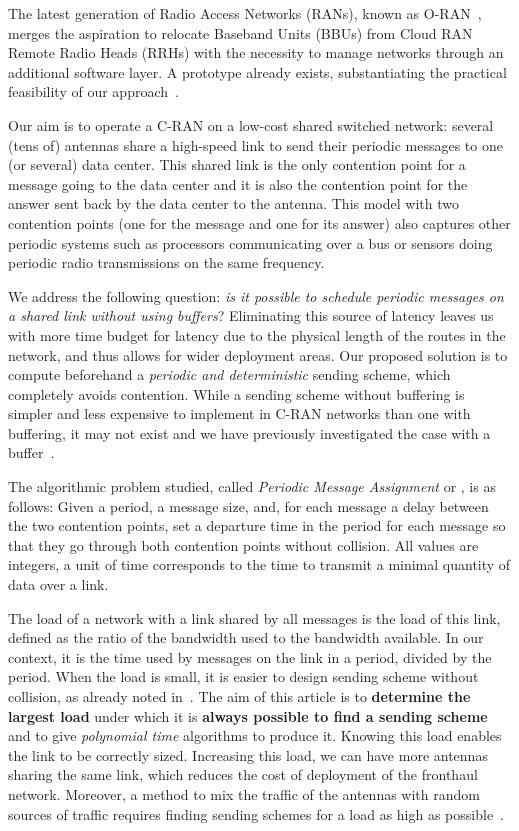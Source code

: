 \documentclass[pdflatex,sn-mathphys,iicol]{sn-jnl}%
\theoremstyle{thmstyleone}%
\theoremstyle{thmstyletwo}%
\theoremstyle{thmstylethree}%
\begin{document}
The latest generation of Radio Access Networks (RANs), known as O-RAN~\cite{polese2023understanding}, merges the aspiration to relocate Baseband Units (BBUs) from Cloud RAN Remote Radio Heads (RRHs) with the necessity to manage networks through an additional software layer. A prototype already exists, substantiating the practical feasibility of our approach~\cite{guiraud2022experimental,leclerc2016transmission,marce2018Coordinated}.

Our aim is to operate a C-RAN on a low-cost shared switched network: several (tens of) antennas share a high-speed link to send their periodic messages to one (or several) data center. This shared link is the only contention point for a message going to the data center and it is also the contention point for the answer sent back by the data center to the antenna. This model with two contention points (one for the message and one for its answer) also captures other periodic systems such as processors communicating over a bus or sensors doing periodic radio transmissions on the same frequency.


We address the following question: \emph{is it possible to schedule periodic messages on a shared link without using buffers}? Eliminating this source of latency leaves us with more time budget for latency due to the physical length of the routes in the network, and thus allows for wider deployment areas. Our proposed solution is to compute beforehand a \emph{periodic and deterministic} sending scheme, which completely avoids contention.  While a sending scheme without buffering is simpler and less expensive to implement in C-RAN networks than one with buffering, it may not exist and we have previously investigated the case with a buffer~\cite{barth2018deterministic}. 

The algorithmic problem studied, called \emph{Periodic Message Assignment} or \pma, is as follows: Given a period, a message size, and, for each message a delay between the two contention points, set a departure time in the period for each message so that they go through both contention points without collision. All values are integers, a unit of time corresponds to the time to transmit a minimal quantity of data over a link. 

The load of a network with a link shared by all messages is the load of this link, defined as the ratio of the bandwidth used to the bandwidth available. In our context, it is the time used by messages on the link in a period, divided by the period. When the load is small, it is easier to design sending scheme without collision, as already noted in~\cite{barth2018deterministic,guiraud2021deterministic}.
The aim of this article is to \textbf{determine the largest load} under which it is \textbf{always possible to find a sending scheme} and to give \emph{polynomial time} algorithms to produce it. 
Knowing this load enables the link to be correctly sized. Increasing this load, we can have more antennas sharing the same link, which reduces the cost of deployment of the fronthaul network. Moreover, a method to mix the traffic of the antennas with random sources of traffic requires finding sending schemes for a load as high as possible~\cite{guiraud2021deterministic}. 
\end{document}
